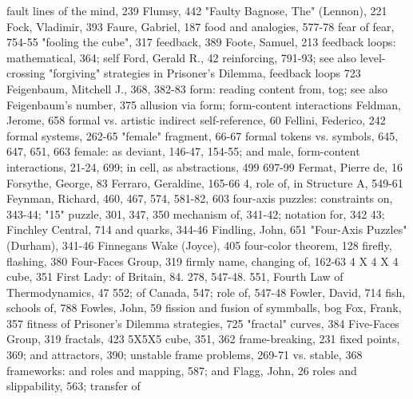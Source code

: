 fault lines of the mind, 239                       Flumsy, 442
"Faulty Bagnose, The" (Lennon), 221                Fock, Vladimir, 393
Faure, Gabriel, 187                                food and analogies, 577-78
fear of fear, 754-55                               "fooling the cube", 317
feedback, 389                                      Foote, Samuel, 213
feedback loops: mathematical, 364; self            Ford, Gerald R., 42
  reinforcing, 791-93; see also level-crossing     "forgiving" strategies in Prisoner's Dilemma,
  feedback loops                                     723
Feigenbaum, Mitchell J., 368, 382-83               form: reading content from, tog; see also
Feigenbaum's number, 375                             allusion via form; form-content interactions
Feldman, Jerome, 658                                 formal vs. artistic indirect self-reference, 60
Fellini, Federico, 242                             formal systems, 262-65
"female" fragment, 66-67                           formal tokens vs. symbols, 645, 647, 651, 663
female: as deviant, 146-47, 154-55; and male,      form-content interactions, 21-24, 699; in cell,
  as abstractions, 499                               697-99
Fermat, Pierre de, 16                              Forsythe, George, 83
Ferraro, Geraldine, 165-66                         4, role of, in Structure A, 549-61
Feynman, Richard, 460, 467, 574, 581-82, 603       four-axis puzzles: constraints on, 343-44;
"15" puzzle, 301, 347, 350                           mechanism of, 341-42; notation for, 342 43;
Finchley Central, 714                                and quarks, 344-46
Findling, John, 651                                "Four-Axis Puzzles" (Durham), 341-46
Finnegans Wake (Joyce), 405                        four-color theorem, 128
firefly, flashing, 380                             Four-Faces Group, 319
firmly name, changing of, 162-63                   4 X 4 X 4 cube, 351
First Lady: of Britain, 84. 278, 547-48. 551,      Fourth Law of Thermodynamics, 47
  552; of Canada, 547; role of, 547-48             Fowler, David, 714
fish, schools of, 788                              Fowles, John, 59
fission and fusion of symmballs, bog               Fox, Frank, 357
fitness of Prisoner's Dilemma strategies, 725      "fractal" curves, 384
Five-Faces Group, 319                              fractals, 423
5X5X5 cube, 351, 362                               frame-breaking, 231
fixed points, 369; and attractors, 390; unstable   frame problems, 269-71
  vs. stable, 368                                  frameworks: and roles and mapping, 587; and
Flagg, John, 26                                      roles and slippability, 563; transfer of
